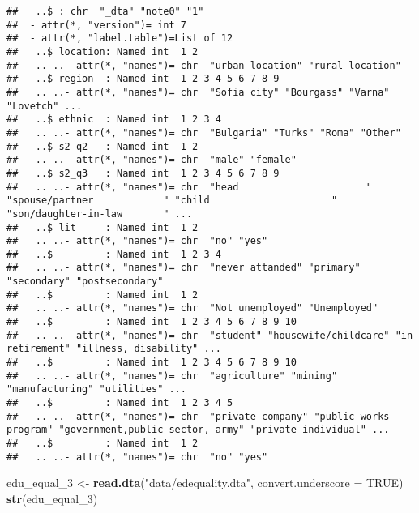\documentclass[]{article}
\newenvironment{Shaded}{\begin{snugshade}}{\end{snugshade}}
\newcommand{\KeywordTok}[1]{\textcolor[rgb]{0.13,0.29,0.53}{\textbf{#1}}}
\newcommand{\DataTypeTok}[1]{\textcolor[rgb]{0.13,0.29,0.53}{#1}}
\newcommand{\DecValTok}[1]{\textcolor[rgb]{0.00,0.00,0.81}{#1}}
\newcommand{\StringTok}[1]{\textcolor[rgb]{0.31,0.60,0.02}{#1}}
\newcommand{\OtherTok}[1]{\textcolor[rgb]{0.56,0.35,0.01}{#1}}
\newcommand{\NormalTok}[1]{#1}
\begin{document}
\begin{verbatim}
##   ..$ : chr  "_dta" "note0" "1"
##  - attr(*, "version")= int 7
##  - attr(*, "label.table")=List of 12
##   ..$ location: Named int  1 2
##   .. ..- attr(*, "names")= chr  "urban location" "rural location"
##   ..$ region  : Named int  1 2 3 4 5 6 7 8 9
##   .. ..- attr(*, "names")= chr  "Sofia city" "Bourgass" "Varna" "Lovetch" ...
##   ..$ ethnic  : Named int  1 2 3 4
##   .. ..- attr(*, "names")= chr  "Bulgaria" "Turks" "Roma" "Other"
##   ..$ s2_q2   : Named int  1 2
##   .. ..- attr(*, "names")= chr  "male" "female"
##   ..$ s2_q3   : Named int  1 2 3 4 5 6 7 8 9
##   .. ..- attr(*, "names")= chr  "head                      " "spouse/partner            " "child                     " "son/daughter-in-law       " ...
##   ..$ lit     : Named int  1 2
##   .. ..- attr(*, "names")= chr  "no" "yes"
##   ..$         : Named int  1 2 3 4
##   .. ..- attr(*, "names")= chr  "never attanded" "primary" "secondary" "postsecondary"
##   ..$         : Named int  1 2
##   .. ..- attr(*, "names")= chr  "Not unemployed" "Unemployed"
##   ..$         : Named int  1 2 3 4 5 6 7 8 9 10
##   .. ..- attr(*, "names")= chr  "student" "housewife/childcare" "in retirement" "illness, disability" ...
##   ..$         : Named int  1 2 3 4 5 6 7 8 9 10
##   .. ..- attr(*, "names")= chr  "agriculture" "mining" "manufacturing" "utilities" ...
##   ..$         : Named int  1 2 3 4 5
##   .. ..- attr(*, "names")= chr  "private company" "public works program" "government,public sector, army" "private individual" ...
##   ..$         : Named int  1 2
##   .. ..- attr(*, "names")= chr  "no" "yes"
\end{verbatim}

\begin{Shaded}
\begin{Highlighting}[]
\NormalTok{edu_equal_}\DecValTok{3}\NormalTok{ <-}\StringTok{ }\KeywordTok{read.dta}\NormalTok{(}\StringTok{"data/edequality.dta"}\NormalTok{, }\DataTypeTok{convert.underscore =} \OtherTok{TRUE}\NormalTok{)}
\KeywordTok{str}\NormalTok{(edu_equal_}\DecValTok{3}\NormalTok{)}
\end{Highlighting}
\end{Shaded}
\end{document}
